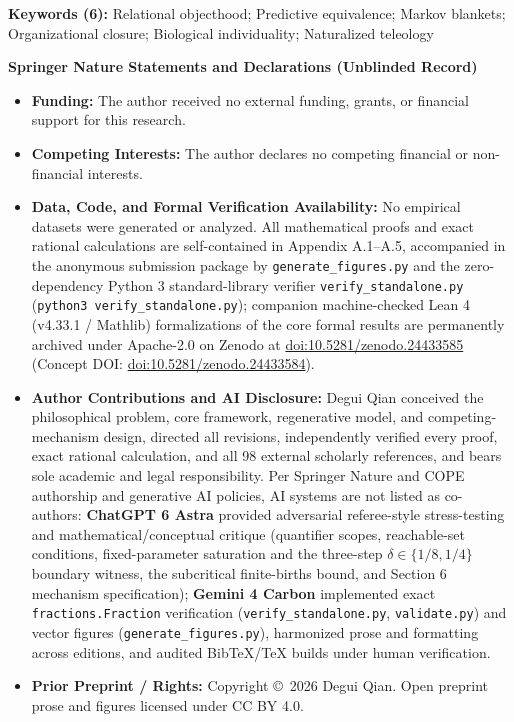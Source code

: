 \documentclass[10pt,a4paper]{article}
\begin{document}
\vspace{6pt}
\noindent\textbf{Keywords (6):} Relational objecthood; Predictive equivalence; Markov blankets; Organizational closure; Biological individuality; Naturalized teleology

\vspace{8pt}
\noindent\textbf{Springer Nature Statements and Declarations (Unblinded Record)}
\begin{itemize}\setlength{\itemsep}{2pt}\setlength{\parskip}{0pt}\setlength{\topsep}{3pt}
  \item \textbf{Funding:} The author received no external funding, grants, or financial support for this research.
  \item \textbf{Competing Interests:} The author declares no competing financial or non-financial interests.
  \item \textbf{Data, Code, and Formal Verification Availability:} No empirical datasets were generated or analyzed. All mathematical proofs and exact rational calculations are self-contained in Appendix A.1--A.5, accompanied in the anonymous submission package by \texttt{generate\_figures.py} and the zero-dependency Python 3 standard-library verifier \texttt{verify\_standalone.py} (\texttt{python3 verify\_standalone.py}); companion machine-checked Lean 4 (v4.33.1 / Mathlib) formalizations of the core formal results are permanently archived under Apache-2.0 on Zenodo at \href{https://doi.org/10.5281/zenodo.24433585}{doi:10.5281/zenodo.24433585} (Concept DOI: \href{https://doi.org/10.5281/zenodo.24433584}{doi:10.5281/zenodo.24433584}).
  \item \textbf{Author Contributions and AI Disclosure:} Degui Qian conceived the philosophical problem, core framework, regenerative model, and competing-mechanism design, directed all revisions, independently verified every proof, exact rational calculation, and all 98 external scholarly references, and bears sole academic and legal responsibility. Per Springer Nature and COPE authorship and generative AI policies, AI systems are not listed as co-authors: \textbf{ChatGPT 6 Astra} provided adversarial referee-style stress-testing and mathematical/conceptual critique (quantifier scopes, reachable-set conditions, fixed-parameter saturation and the three-step $\delta \in \{1/8, 1/4\}$ boundary witness, the subcritical finite-births bound, and Section 6 mechanism specification); \textbf{Gemini 4 Carbon} implemented exact \texttt{fractions.Fraction} verification (\texttt{verify\_standalone.py}, \texttt{validate.py}) and vector figures (\texttt{generate\_figures.py}), harmonized prose and formatting across editions, and audited BibTeX/TeX builds under human verification.
  \item \textbf{Prior Preprint / Rights:} Copyright \copyright\ 2026 Degui Qian. Open preprint prose and figures licensed under CC BY 4.0.
\end{itemize}
\end{document}
